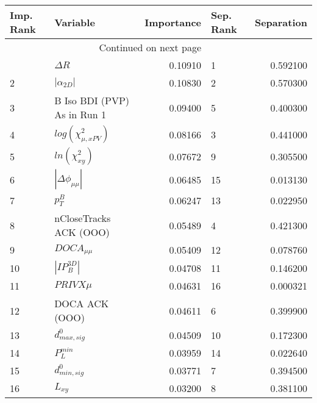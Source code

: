 \usepackage{lscape}

\begin{landscape}
\begin{longtable}{llrlr}
\toprule
Imp. Rank &                     Variable &  Importance & Sep. Rank &  Separation \\
\midrule
\endhead
\midrule
\multicolumn{3}{r}{{Continued on next page}} \\
\midrule
\endfoot

\bottomrule
\endlastfoot
        1 &                   $\Delta R$ &     0.10910 &         1 &    0.592100 \\
        2 &              $|\alpha_{2D}|$ &     0.10830 &         2 &    0.570300 \\
        3 &  B Iso BDI (PVP) As in Run 1 &     0.09400 &         5 &    0.400300 \\
        4 &    $log(\chi^{2}_{\mu,xPV})$ &     0.08166 &         3 &    0.441000 \\
        5 &          $ln(\chi^{2}_{xy})$ &     0.07672 &         9 &    0.305500 \\
        6 &     $|\Delta \phi_{\mu\mu}|$ &     0.06485 &        15 &    0.013130 \\
        7 &                    $p^B_{T}$ &     0.06247 &        13 &    0.022950 \\
        8 &       nCloseTracks ACK (OOO) &     0.05489 &         4 &    0.421300 \\
        9 &              $DOCA_{\mu\mu}$ &     0.05409 &        12 &    0.078760 \\
       10 &              $|IP_{B}^{3D}|$ &     0.04708 &        11 &    0.146200 \\
       11 &                   $PRIVX\mu$ &     0.04631 &        16 &    0.000321 \\
       12 &               DOCA ACK (OOO) &     0.04611 &         6 &    0.399900 \\
       13 &             $d^0_{max, sig}$ &     0.04509 &        10 &    0.172300 \\
       14 &                $P^{min}_{L}$ &     0.03959 &        14 &    0.022640 \\
       15 &             $d^0_{min, sig}$ &     0.03771 &         7 &    0.394500 \\
       16 &                     $L_{xy}$ &     0.03200 &         8 &    0.381100 \\
\end{longtable}

\end{landscape}
